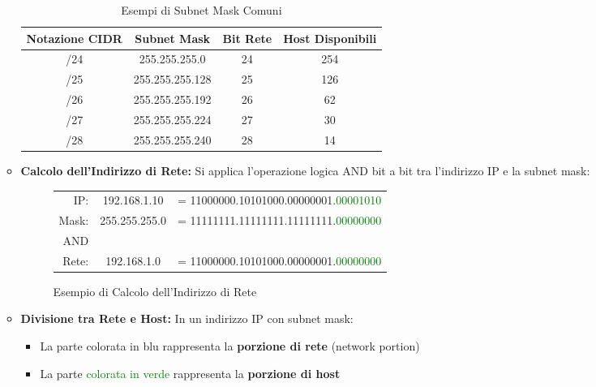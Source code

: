 \begin{itemize}
\begin{itemize}
        \begin{table}[H]
            \centering
            \begin{tabular}{|c|c|c|c|}
                \hline
                \textbf{Notazione CIDR} & \textbf{Subnet Mask} & \textbf{Bit Rete} & \textbf{Host Disponibili} \\
                \hline
                /24 & 255.255.255.0 & 24 & 254 \\
                /25 & 255.255.255.128 & 25 & 126 \\
                /26 & 255.255.255.192 & 26 & 62 \\
                /27 & 255.255.255.224 & 27 & 30 \\
                /28 & 255.255.255.240 & 28 & 14 \\
                \hline
            \end{tabular}
            \caption{Esempi di Subnet Mask Comuni}
        \end{table}

        \item \textbf{Calcolo dell'Indirizzo di Rete:} Si applica l'operazione logica AND bit a bit tra l'indirizzo IP e la subnet mask:
        
        \begin{figure}[H]
            \centering
            \begin{tabular}{rcl}
                IP: & 192.168.1.10 & = \textcolor{themeblue}{11000000.10101000.00000001}.\textcolor{green}{00001010} \\
                Mask: & 255.255.255.0 & = \textcolor{themeblue}{11111111.11111111.11111111}.\textcolor{green}{00000000} \\
                \hline
                AND & & \\
                \hline
                Rete: & 192.168.1.0 & = \textcolor{themeblue}{11000000.10101000.00000001}.\textcolor{green}{00000000} \\
            \end{tabular}
            \caption{Esempio di Calcolo dell'Indirizzo di Rete}
        \end{figure}
        
        \item \textbf{Divisione tra Rete e Host:} In un indirizzo IP con subnet mask:
        
        \begin{itemize}
            \item La parte \textcolor{themeblue}{colorata in blu} rappresenta la \textbf{porzione di rete} (network portion)
            \item La parte \textcolor{green}{colorata in verde} rappresenta la \textbf{porzione di host}
        \end{itemize}
        

\end{itemize}
\end{itemize}

